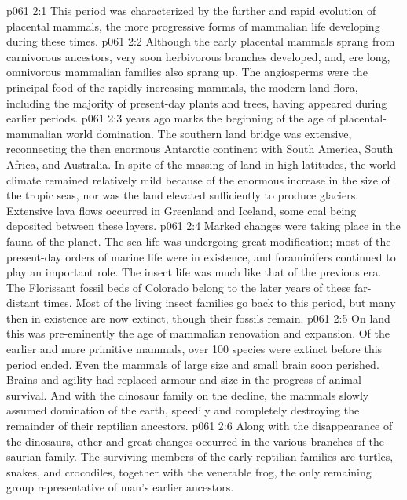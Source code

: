 \vs p061 2:1 This period was characterized by the further and rapid evolution of placental mammals, the more progressive forms of mammalian life developing during these times.
\vs p061 2:2 Although the early placental mammals sprang from carnivorous ancestors, very soon herbivorous branches developed, and, ere long, omnivorous mammalian families also sprang up. The angiosperms were the principal food of the rapidly increasing mammals, the modern land flora, including the majority of present\hyp{}day plants and trees, having appeared during earlier periods.
\vs p061 2:3 \pc {} years ago marks the beginning of the age of placental\hyp{}mammalian world domination. The southern land bridge was extensive, reconnecting the then enormous Antarctic continent with South America, South Africa, and Australia. In spite of the massing of land in high latitudes, the world climate remained relatively mild because of the enormous increase in the size of the tropic seas, nor was the land elevated sufficiently to produce glaciers. Extensive lava flows occurred in Greenland and Iceland, some coal being deposited between these layers.
\vs p061 2:4 Marked changes were taking place in the fauna of the planet. The sea life was undergoing great modification; most of the present\hyp{}day orders of marine life were in existence, and foraminifers continued to play an important role. The insect life was much like that of the previous era. The Florissant fossil beds of Colorado belong to the later years of these far\hyp{}distant times. Most of the living insect families go back to this period, but many then in existence are now extinct, though their fossils remain.
\vs p061 2:5 On land this was pre\hyp{}eminently the age of mammalian renovation and expansion. Of the earlier and more primitive mammals, over 100 species were extinct before this period ended. Even the mammals of large size and small brain soon perished. Brains and agility had replaced armour and size in the progress of animal survival. And with the dinosaur family on the decline, the mammals slowly assumed domination of the earth, speedily and completely destroying the remainder of their reptilian ancestors.
\vs p061 2:6 Along with the disappearance of the dinosaurs, other and great changes occurred in the various branches of the saurian family. The surviving members of the early reptilian families are turtles, snakes, and crocodiles, together with the venerable frog, the only remaining group representative of man’s earlier ancestors.
